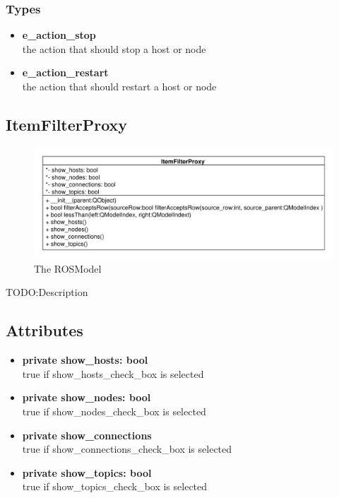 \subsubsection{Types}
\begin{itemize}
	\item \textbf{e\_action\_stop}\\
	the action that should stop a host or node
	\item \textbf{e\_action\_restart}\\
	the action that should restart a host or node
\end{itemize}

\newpage
\subsection{ItemFilterProxy}
\begin{figure}[htbp]
	\begin{minipage}[t]{7cm}
		\vspace{0pt}
		\centering
		\includegraphics[scale=0.6]{./diagram_pictures/ItemFilter.pdf}
		\caption{The ROSModel}
	\end{minipage}
\end{figure} 
TODO:Description
\subsection{Attributes}
\begin{itemize}
  \item \textbf{private show\_hosts: bool}\\
  true if show\_hosts\_check\_box is selected
  \item \textbf{private show\_nodes: bool}\\
  true if show\_nodes\_check\_box is selected
  \item \textbf{private show\_connections}\\
  true if show\_connections\_check\_box is selected
  \item \textbf{private show\_topics: bool}\\
  true if show\_topics\_check\_box is selected
\end{itemize}
